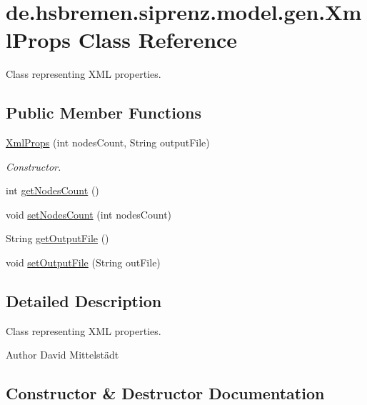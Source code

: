 \hypertarget{classde_1_1hsbremen_1_1siprenz_1_1model_1_1gen_1_1XmlProps}{}\section{de.\+hsbremen.\+siprenz.\+model.\+gen.\+Xml\+Props Class Reference}
\label{classde_1_1hsbremen_1_1siprenz_1_1model_1_1gen_1_1XmlProps}


Class representing X\+ML properties.  


\subsection*{Public Member Functions}
\begin{DoxyCompactItemize}
\item 
\hyperlink{classde_1_1hsbremen_1_1siprenz_1_1model_1_1gen_1_1XmlProps_a27d294cb758c5cc9e345b34fc3767b82}{Xml\+Props} (int nodes\+Count, String output\+File)
\begin{DoxyCompactList}\small\item\em Constructor. \end{DoxyCompactList}\item 
int \hyperlink{classde_1_1hsbremen_1_1siprenz_1_1model_1_1gen_1_1XmlProps_ac4d29f604c4fb52a75c07e74f692dac7}{get\+Nodes\+Count} ()
\item 
void \hyperlink{classde_1_1hsbremen_1_1siprenz_1_1model_1_1gen_1_1XmlProps_a2a4b152e6c5dcf3152cf1dd1f93d55c6}{set\+Nodes\+Count} (int nodes\+Count)
\item 
String \hyperlink{classde_1_1hsbremen_1_1siprenz_1_1model_1_1gen_1_1XmlProps_a231e270615fd3fa569d810bb3a24670f}{get\+Output\+File} ()
\item 
void \hyperlink{classde_1_1hsbremen_1_1siprenz_1_1model_1_1gen_1_1XmlProps_a8f29f92cfad597322f352b2647d64053}{set\+Output\+File} (String out\+File)
\end{DoxyCompactItemize}


\subsection{Detailed Description}
Class representing X\+ML properties. 

\begin{DoxyAuthor}{Author}
David Mittelstädt 
\end{DoxyAuthor}


\subsection{Constructor \& Destructor Documentation}
